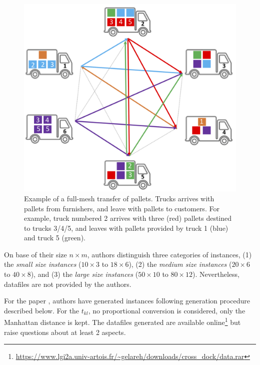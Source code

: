 \documentclass[preprint,12pt,authoryear]{elsarticle}
\begin{document}
\noindent 
\begin{figure}[h!]
\begin{minipage}{0.5\textwidth}
\centering
\includegraphics[scale=0.36]{images/fullmesh.png}
\end{minipage}
\begin{minipage}{0.5\textwidth}
\caption{Example of a full-mesh transfer of pallets. Trucks arrives with pallets from furnishers, and leave with pallets to customers. For example, truck numbered 2 arrives with three (red) pallets destined to trucks 3/4/5, and leaves with pallets provided by truck 1 (blue) and truck 5 (green).}
\label{fig:fluxfullmesh}
\end{minipage}
\end{figure}

On base of their size $n \times m$, authors distinguish  three categories of instances,  
%
(1) the \textit{small size instances} ($10 \times 3$ to $18 \times 6$),
(2) the \textit{medium size instances} ($20 \times 6$ to $40  \times 8$), and
(3) the \textit{large size instances} ($50 \times 10$ to $80 \times 12$).
%
Nevertheless, datafiles are not provided by the authors. 


For the paper \citep{Gelareh2015}, authors have generated instances following generation procedure described below.
For the $t_{kl}$, no proportional conversion is considered, only the Manhattan distance is kept.
The datafiles generated are available online\footnote{\url{https://www.lgi2a.univ-artois.fr/~gelareh/downloads/cross_dock/data.rar}} but raise questions about at least 2 aspects.
\end{document}
